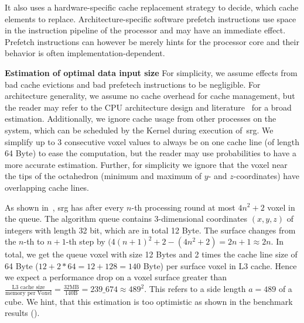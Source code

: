 \documentclass{article}
\begin{document}
It also uses a hardware-specific cache replacement strategy to decide, which cache elements to replace.
Architecture-specific software prefetch instructions use space in the instruction pipeline of the processor and may have an immediate effect.
Prefetch instructions can however be merely hints for the processor core and their behavior is often implementation-dependent.\par
\textbf{Estimation of optimal data input size}
For simplicity, we assume effects from bad cache evictions and bad prefetech instructions to be negligible.
For architecture generality, we assume no cache overhead for cache management, but the reader may refer to the CPU architecture design and literature~\cite{patterson2013} for a broad estimation.
Additionally, we ignore cache usage from other processes on the system, which can be scheduled by the Kernel during execution of~\ac{srg}.
We simplify up to 3 consecutive voxel values to always be on one cache line (of length 64 Byte) to ease the computation, but the reader may use probabilities to have a more accurate estimation.
Further, for simplicity we ignore that the voxel near the tips of the octahedron (minimum and maximum of $y$- and $z$-coordinates) have overlapping cache lines.\par
As shown in~, \ac{srg} has after every $n$-th processing round at most $4n^2+2$ voxel in the queue.
The algorithm queue contains 3-dimensional coordinates $(x,y,z)$ of integers with length 32 bit, which are in total 12 Byte.
The surface changes from the $n$-th to $n+1$-th step by $(4(n+1)^2+2-(4n^2+2)=2n+1\approx 2n$.
In total, we get the queue voxel with size 12 Bytes and 2 times the cache line size of 64 Byte ($12+2*64 = 12+128 = 140$ Byte) per surface voxel in L3 cache.
Hence we expect a performance drop on a voxel surface greater than $\frac{\text{L3 cache size}}{\text{memory per Voxel}}=\frac{32\text{MB}}{140\text{B}} = 239\_674 \approx 489^2$.
This refers to a side length $a = 489$ of a cube.
We hint, that this estimation is too optimistic as shown in the benchmark results ().
\end{document}
